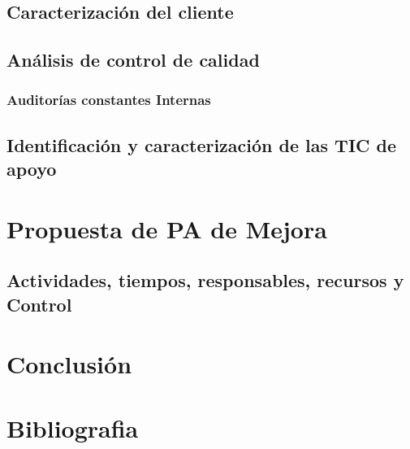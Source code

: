 	
	\subsection{Caracterización del cliente}
	\subsection{Análisis de control de calidad}
	
	
	\subsubsection{Auditorías constantes Internas}
	\subsection{Identificación y caracterización de las TIC de apoyo}
	
\section{Propuesta de PA de Mejora}
\subsection{Actividades, tiempos, responsables, recursos y Control}
\section{Conclusión}
\section{Bibliografia}

	

